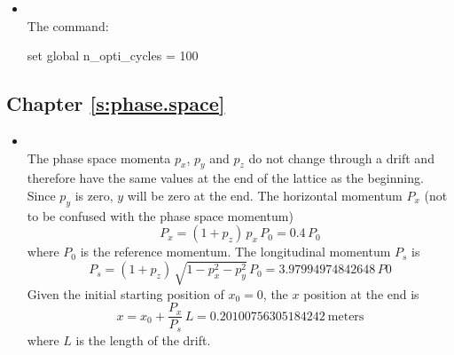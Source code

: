 \documentclass{hitec}     %
\begin{document}
{{{{\begin{itemize}[leftmargin=*]
%
\item[]\hspace*{-24pt} \\
The  command:
\begin{code}
set global n_opti_cycles = 100
\end{code}
\end{itemize}

\subsection{Chapter \ref{s:phase.space}}   %

\begin{itemize}[leftmargin=*]
%
\item[]\hspace*{-24pt} \\
The phase space momenta $p_x$, $p_y$ and $p_z$ do not change through a drift and therefore have the same values at the 
end of the lattice as the beginning. Since $p_y$ is zero, $y$ will be zero at the end. The horizontal momentum $P_x$ (not to be confused with the phase space momentum)
\begin{equation}
    P_x = (1 + p_z) \, p_x \, P_0 = 0.4 \, P_0
\end{equation}
where $P_0$ is the reference momentum. The longitudinal momentum $P_s$ is
\begin{equation}
    P_s = (1 + p_z) \, \sqrt{1 - p_x^2 - p_y^2} \, P_0 = 3.97994974842648 \, P0
\end{equation}
Given the initial starting position of $x_0 = 0$,  the $x$ position at the end is
\begin{equation}
    x = x_0 + \frac{P_x}{P_s} \, L = 0.20100756305184242~\text{meters}
\end{equation}
where $L$ is the length of the drift.


\end{itemize}}}}}
\end{document}
